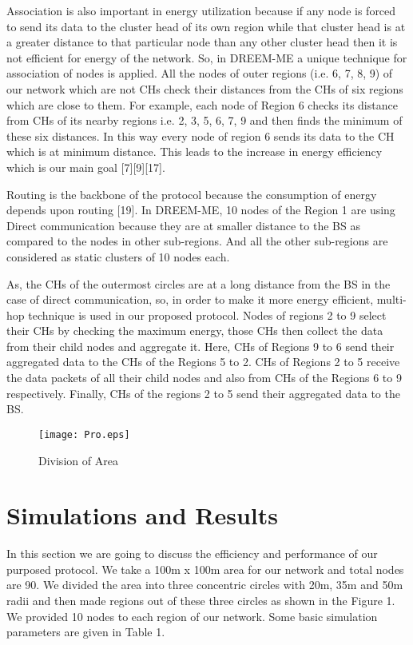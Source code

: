 \documentclass[journal]{IEEEtran}
\begin{document}
Association is also important in energy utilization because if any node is forced to send its data to the cluster head of its own region while that cluster head is at a greater distance to that particular node than any other cluster head then it is not efficient for energy of the network. So, in DREEM-ME a unique technique for association of nodes is applied. All the nodes of outer regions (i.e. 6, 7, 8, 9) of our network which are not CHs check their distances from the CHs of six regions which are close to them. For example, each node of Region 6 checks its distance from CHs of its nearby regions i.e. 2, 3, 5, 6, 7, 9 and then finds the minimum of these six distances. In this way every node of region 6 sends its data to the CH which is at minimum distance. This leads to the increase in energy efficiency which is our main goal [7][9][17].

Routing is the backbone of the protocol because the consumption of energy depends upon routing [19]. In DREEM-ME, 10 nodes of the Region 1 are using Direct communication because they are at smaller distance to the BS as compared to the nodes in other sub-regions. And all the other sub-regions are considered as static clusters of 10 nodes each.

 As, the CHs of the outermost circles are at a long distance from the BS in the case of direct communication, so, in order to make it more energy efficient, multi-hop technique is used in our proposed protocol. Nodes of regions 2 to 9 select their CHs by checking the maximum energy, those CHs then collect the data from their child nodes and aggregate it. Here, CHs of Regions 9 to 6 send their aggregated data to the CHs of the Regions 5 to 2. CHs of Regions 2 to 5 receive the data packets of all their child nodes and also from CHs of the Regions 6 to 9 respectively. Finally, CHs of the regions 2 to 5 send their aggregated data to the BS.


\begin{figure*}[t]
\centering
\texttt{[image: Pro.eps]}
\caption{Division of Area}
\end{figure*}

\section{Simulations and Results}
 In this section we are going to discuss the efficiency and performance of our purposed protocol. We take a 100m x 100m area for our network and total nodes are 90. We divided the area into three concentric circles with 20m, 35m and 50m radii and then made regions out of these three circles as shown in the Figure 1. We provided 10 nodes to each region of our network. Some basic simulation parameters are given in Table 1.
\end{document}

